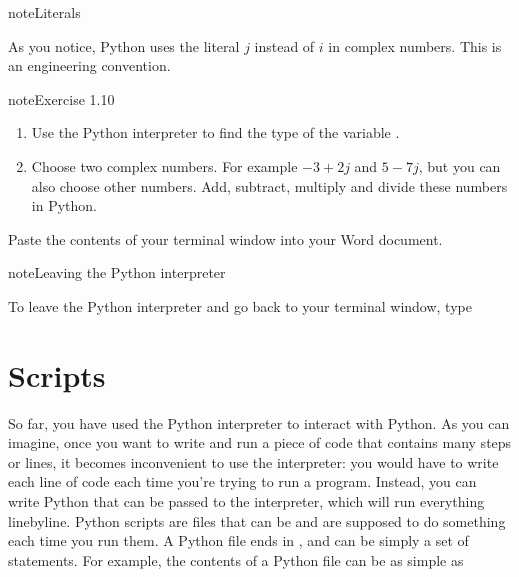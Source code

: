 \documentclass[letterpaper,10pt,english]{jupyterBook}
\begin{document}
\begin{sphinxadmonition}{note}{Literals}

\sphinxAtStartPar
As you notice, Python uses the literal \(j\) instead of \(i\) in complex numbers. This is an engineering convention.
\end{sphinxadmonition}

\begin{sphinxadmonition}{note}{Exercise 1.10}
\begin{enumerate}
%
\item {} 
\sphinxAtStartPar
Use the Python interpreter to find the type of the variable .

\item {} 
\sphinxAtStartPar
Choose two complex numbers. For example \(-3 + 2j\) and \(5-7j\), but you can also choose other numbers. Add, subtract, multiply and divide these numbers in Python.

\end{enumerate}

\sphinxAtStartPar
Paste the contents of your terminal window into your Word document.
\end{sphinxadmonition}

\begin{sphinxadmonition}{note}{Leaving the Python interpreter}

\sphinxAtStartPar
To leave the Python interpreter and go back to your terminal window, type

\begin{sphinxVerbatim}[commandchars=\\\{\}]
\end{sphinxVerbatim}
\end{sphinxadmonition}


\section{Scripts}
\label{\detokenize{notebooks/01_GettingStarted/01_GettingStarted_student:scripts}}
\sphinxAtStartPar
So far, you have used the Python interpreter to interact with Python. As you can imagine, once you want to write and run a piece of code that contains many steps or lines, it becomes inconvenient to use the interpreter: you would have to write each line of code each time you’re trying to run a program. Instead, you can write Python  that can be passed to the interpreter, which will run everything line\sphinxhyphen{}by\sphinxhyphen{}line. Python scripts are files that can be  and are supposed to do something each time you run them. A Python file ends in , and can be simply a set of statements. For example, the contents of a Python file can be as simple as
\end{document}
